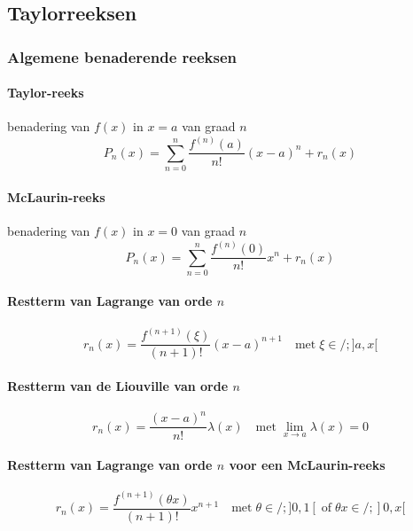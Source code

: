 \subsection{Taylorreeksen}
\label{sec:Taylorreeksen}
  \subsubsection{Algemene benaderende reeksen}
  \label{sec:algbBenadering}
    \paragraph{Taylor-reeks} benadering van $f\left(x\right)$ in $x=a$ van graad $n$
      \[
        P_n\left(x\right) = \sum_{n=0}^n \frac{f^{\left(n\right)}\left(a\right)}{n!}\left(x-a\right)^n + r_n\left(x\right)
      \]
    \paragraph{McLaurin-reeks} benadering van $f\left(x\right)$ in $x=0$ van graad $n$ 
      \[
        P_n\left(x\right) = \sum_{n=0}^n \frac{f^{\left(n\right)}\left(0\right)}{n!}x^n + r_n\left(x\right)
      \]
    \paragraph{Restterm van Lagrange van orde $n$}
      \[
        r_n\left(x\right) = \frac{f^{\left(n+1\right)}\left( \xi \right)}{\left(n+1\right)!}\left(x-a\right)^{n+1}
        \quad \mbox{met} \;
        \xi \in/; ]a,x[
      \]
    \paragraph{Restterm van de Liouville van orde $n$}
      \[
        r_n\left(x\right) = \frac{\left(x-a\right)^n}{n!}\lambda \left( x \right)
        \quad \mbox{met} \;
        \lim_{x \to a} \lambda (x) = 0
      \]
    \paragraph{Restterm van Lagrange van orde $n$ voor een McLaurin-reeks}
      \[
        r_n\left(x\right) = \frac{f^{\left(n+1\right)}\left( \theta x \right)}{\left(n+1\right)!}x^{n+1}
        \quad \mbox{met} \;
        \theta \in/; ]0,1[ \;\mbox{of}\; \theta x \in/; ]0,x[
      \]
